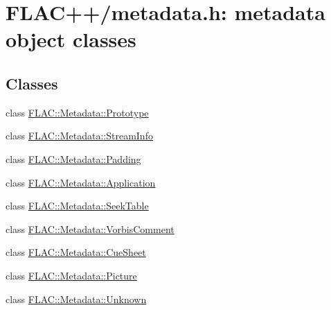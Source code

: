 \hypertarget{group__flacpp__metadata__object}{}\section{F\+L\+A\+C++/metadata.h\+: metadata object classes}
\label{group__flacpp__metadata__object}
\subsection*{Classes}
\begin{DoxyCompactItemize}
\item 
class \hyperlink{class_f_l_a_c_1_1_metadata_1_1_prototype}{F\+L\+A\+C\+::\+Metadata\+::\+Prototype}
\item 
class \hyperlink{class_f_l_a_c_1_1_metadata_1_1_stream_info}{F\+L\+A\+C\+::\+Metadata\+::\+Stream\+Info}
\item 
class \hyperlink{class_f_l_a_c_1_1_metadata_1_1_padding}{F\+L\+A\+C\+::\+Metadata\+::\+Padding}
\item 
class \hyperlink{class_f_l_a_c_1_1_metadata_1_1_application}{F\+L\+A\+C\+::\+Metadata\+::\+Application}
\item 
class \hyperlink{class_f_l_a_c_1_1_metadata_1_1_seek_table}{F\+L\+A\+C\+::\+Metadata\+::\+Seek\+Table}
\item 
class \hyperlink{class_f_l_a_c_1_1_metadata_1_1_vorbis_comment}{F\+L\+A\+C\+::\+Metadata\+::\+Vorbis\+Comment}
\item 
class \hyperlink{class_f_l_a_c_1_1_metadata_1_1_cue_sheet}{F\+L\+A\+C\+::\+Metadata\+::\+Cue\+Sheet}
\item 
class \hyperlink{class_f_l_a_c_1_1_metadata_1_1_picture}{F\+L\+A\+C\+::\+Metadata\+::\+Picture}
\item 
class \hyperlink{class_f_l_a_c_1_1_metadata_1_1_unknown}{F\+L\+A\+C\+::\+Metadata\+::\+Unknown}
\end{DoxyCompactItemize}
